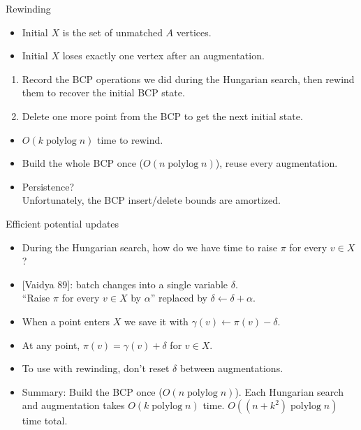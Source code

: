 \documentclass[xcolor={dvipsnames,usenames},handout]{beamer} %
\DeclareMathOperator{\polylog}{polylog}
\begin{document}
\begin{frame}{Rewinding}
\begin{itemize}
\item Initial $X$ is the set of unmatched $A$ vertices.
\pause
\item Initial $X$ loses exactly one vertex after an augmentation.
\end{itemize}
\pause
\vspace{10pt}
\begin{enumerate}
\item Record the BCP operations we did during the Hungarian search, then
	\alert{rewind} them to recover the initial BCP state.
\pause
\item Delete one more point from the BCP to get the next initial state.
\end{enumerate}
\pause
\vspace{10pt}
\begin{itemize}
\item $O(k\polylog n)$ time to rewind.
\pause
\item Build the whole BCP once ($O(n\polylog n)$), reuse every augmentation.
\pause
\item Persistence?\\
\pause
Unfortunately, the BCP insert/delete bounds are amortized.
\end{itemize}
\end{frame}

\begin{frame}{Efficient potential updates}
\begin{itemize}
\item During the Hungarian search, how do we have time to raise $\pi$ for every $v \in X$?
\pause
\item {[Vaidya 89]}: batch changes into a single variable $\delta$.\\
	``Raise $\pi$ for every $v \in X$ by $\alpha$'' replaced by $\delta \gets \delta + \alpha$.
\vspace{10pt}
\pause
\item When a point enters $X$ we save it with $\gamma(v) \gets \pi(v) - \delta$.
\pause
\item At any point, $\pi(v) = \gamma(v) + \delta$ for $v \in X$.
\vspace{10pt}
\pause
\item To use with rewinding, don't reset $\delta$ between augmentations.
\vspace{10pt}
\pause
\item Summary: Build the BCP once ($O(n\polylog n)$).
	Each Hungarian search and augmentation takes $O(k\polylog n)$ time.
	$O((n+k^2)\polylog n)$ time total.
\end{itemize}

\end{frame}
\end{document}
